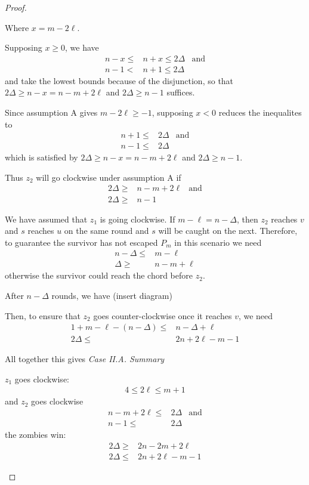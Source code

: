 \begin{proof}
\begin{proofpart}
  Where $x = m -2\ell$.

  Supposing $x\geq 0$, we have
  \begin{align*}
   n-x \leq & n+x \leq 2 \Delta & \text{and} \\
   n-1 < & n+1 \leq 2 \Delta
  \end{align*}
  and take the lowest bounds because of the disjunction, so that
   $2\Delta \geq n-x = n-m+2\ell$ and $2\Delta \geq n-1$ suffices.

  Since assumption A gives $m-2\ell \geq -1$, supposing $x < 0$ reduces the inequalites to
  \begin{align*}
   n+1 \leq & 2 \Delta & \text{and} \\
   n-1 \leq & 2 \Delta
  \end{align*}
  which is satisfied by $2\Delta \geq n-x = n-m+2\ell$ and $2\Delta \geq n-1$.

  Thus $z_2$ will go clockwise under assumption A if
  \begin{align*}
   2\Delta \geq & n-m+2\ell & \text{and} \\
    2\Delta \geq & n-1
  \end{align*}

  We have assumed that $z_1$ is going clockwise. If $m - \ell = n - \Delta$,
  then $z_2$ reaches $v$ and $s$ reaches $u$ on the same round and $s$
  will be caught on the next. Therefore, to guarantee the survivor has not
  escaped $P_m$ in this scenario we need
  \begin{align*}
   n - \Delta \leq & m - \ell     \\
   \Delta \geq     & n - m + \ell
  \end{align*}
  otherwise the survivor could reach the chord before $z_2$.

  After $n-\Delta$ rounds, we have (insert diagram)

  Then, to ensure that $z_2$ goes counter-clockwise once
  it reaches $v$, we need
  \begin{align*}
   1 + m - \ell - (n - \Delta) \leq & n - \Delta + \ell  \\
   2 \Delta \leq                    & 2n + 2\ell - m - 1
  \end{align*}


  All together this gives
  \textit{Case II.A. Summary}

  $z_1$ goes clockwise:
  \begin{align*}
   4 \leq 2 \ell \leq m + 1
  \end{align*}
  and $z_2$ goes clockwise
  \begin{align*}
   n -m + 2\ell \leq & 2 \Delta & \text{and} \\
   n-1 \leq          & 2 \Delta
  \end{align*}
  the zombies win:
  \begin{align*}
   2 \Delta \geq & 2n - 2m + 2\ell    \\
   2 \Delta \leq & 2n + 2\ell - m - 1
  \end{align*}


\end{proofpart}
\end{proof}
